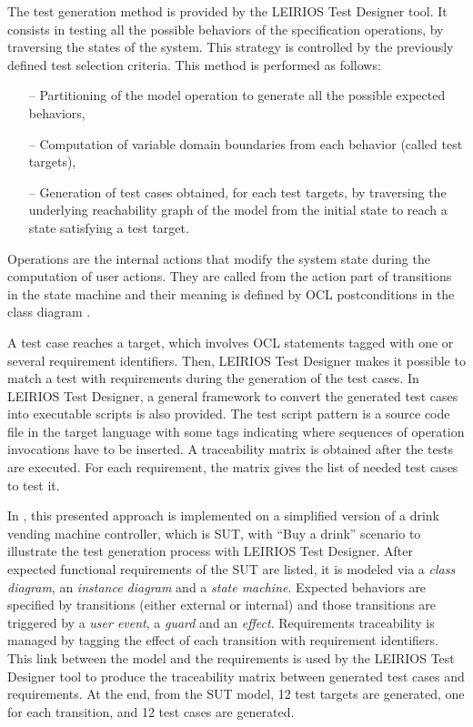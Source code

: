 The test generation method is provided by the LEIRIOS Test Designer tool. It consists in testing all the possible behaviors of the specification operations, by traversing the states of the system. This strategy is controlled by the previously defined test selection criteria. This method is performed as follows:
%
\begin{itemize}[noitemsep]
  \item [--]Partitioning of the model operation to generate all the possible expected behaviors,
  \item [--]Computation of variable domain boundaries from each behavior (called test targets),
   \item [--] Generation of test cases obtained, for each test targets, by traversing the underlying reachability graph of the model from the initial state to reach a state satisfying a test target.
\end{itemize}
Operations are the internal actions that modify the system state during the computation of user actions. They are called from the action part of transitions in the state machine and their meaning is defined by OCL postconditions in the class diagram \cite{LTG}. 

A test case reaches a target, which involves OCL statements tagged with one or several requirement identifiers. Then, LEIRIOS Test Designer makes it possible to match a test with requirements during the generation of the test cases. In LEIRIOS Test Designer, a general framework to convert the generated test cases into executable scripts is also provided. The test script pattern is a source code file in the target language with some tags indicating where sequences of operation invocations have to be inserted. A traceability matrix is obtained after the tests are executed. For each requirement, the matrix gives the list of needed test cases to test it. 

In \cite{Paper2}, this presented approach is implemented on a simplified version of a drink vending machine controller, which is SUT, with \enquote{Buy a drink} scenario to illustrate the test generation process with LEIRIOS Test Designer. After expected functional requirements of the SUT are listed, it is modeled via a \textit{class diagram}, an \textit{instance diagram} and a \textit{state machine}. Expected behaviors are specified by transitions (either external or internal) and those transitions are triggered by a \textit{user event}, a \textit{guard} and an \textit{effect}. Requirements traceability is managed by tagging the effect of each transition with requirement identifiers. This link between the model and the requirements is used by the LEIRIOS Test Designer tool to produce the traceability matrix between generated test cases and requirements. At the end, from the SUT model, 12 test targets are generated, one for each transition, and 12 test cases are generated. 

